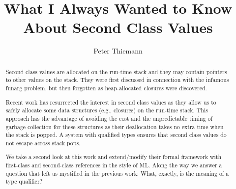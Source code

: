 \documentclass[sigplan,review,dvipsnames,screen,10pt]{acmart}
\begin{document}
\title{What I Always Wanted to Know About Second Class Values}

\author{Peter Thiemann}

\begin{abstract}
Second class values are allocated on the run-time stack and they may contain pointers
to other values on the stack. They were first discussed in connection with the
infamous funarg problem, but then forgotten as heap-allocated closures were
discovered.

Recent work has resurrected the interest in second class values as they allow us
to safely allocate some data structures (e.g., closures) on the run-time stack.
This approach has the advantage of avoiding the cost and the
unpredictable timing of garbage collection for
these structures as their deallocation takes no extra time when the
stack is popped. 
A system with qualified types ensures that second class values do not
escape across stack pops.

We take a second look at this work and extend/modify their formal framework
with first-class and second-class references in the style of ML. Along
the way we answer a question that left us mystified in the previous
work:  What, exactly, is the meaning of a type qualifier? 

\end{abstract}

\end{document}
